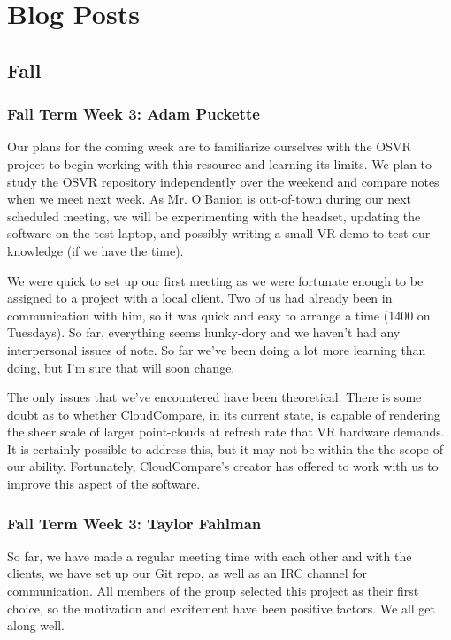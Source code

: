 \documentclass[draftclsnofoot,onecolumn]{IEEEtran}
\begin{document}
\section{Blog Posts}

\subsection{Fall}

\subsubsection{Fall Term Week 3: Adam Puckette}

Our plans for the coming week are to familiarize ourselves with the OSVR project to begin working with this resource and learning its limits. 
We plan to study the OSVR repository independently over the weekend and compare notes when we meet next week. 
As Mr. O'Banion is out-of-town during our next scheduled meeting, we will be experimenting with the headset, updating the software on the test laptop, and possibly writing a small VR demo to test our knowledge (if we have the time).

We were quick to set up our first meeting as we were fortunate enough to be assigned to a project with a local client. 
Two of us had already been in communication with him, so it was quick and easy to arrange a time (1400 on Tuesdays). 
So far, everything seems hunky-dory and we haven't had any interpersonal issues of note. 
So far we've been doing a lot more learning than doing, but I'm sure that will soon change.

The only issues that we've encountered have been theoretical. 
There is some doubt as to whether CloudCompare, in its current state, is capable of rendering the sheer scale of larger point-clouds at refresh rate that VR hardware demands. 
It is certainly possible to address this, but it may not be within the the scope of our ability. 
Fortunately, CloudCompare's creator has offered to work with us to improve this aspect of the software. 

\subsubsection{Fall Term Week 3: Taylor Fahlman}

So far, we have made a regular meeting time with each other and with the clients, we have set up our Git repo, as well as an IRC channel for communication. 
All members of the group selected this project as their first choice, so the motivation and excitement have been positive factors. 
We all get along well.
\end{document}
